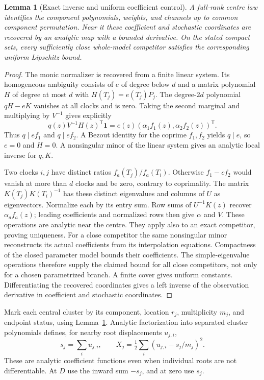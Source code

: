 \documentclass[11pt,reqno]{amsart}
\numberwithin{equation}{section}
\newtheorem{lemma}[theorem]{Lemma}
\theoremstyle{definition}
\theoremstyle{remark}
\newcommand{\one}{\mathbf 1}
\begin{document}
\begin{lemma}[Exact inverse and uniform coefficient control]\label{lem:inverse}
A full-rank centre law identifies the component polynomials, weights, and channels up to common component permutation. Near it these coefficient and stochastic coordinates are recovered by an analytic map with a bounded derivative. On the stated compact sets, every sufficiently close whole-model competitor satisfies the corresponding uniform Lipschitz bound.
\end{lemma}
\begin{proof}
The monic normalizer is recovered from a finite linear system. Its homogeneous ambiguity consists of $e$ of degree below $d$ and a matrix polynomial $H$ of degree at most $d$ with $H(T_j)=e(T_j)P_j$. The degree-$2d$ polynomial $qH-eK$ vanishes at all clocks and is zero. Taking the second marginal and multiplying by $V^{-1}$ gives explicitly
\[
 q(z)V^{-1}H(z)^{\mathsf T}\one
       =e(z)(\alpha_1 f_1(z),\alpha_2 f_2(z))^{\mathsf T}.
\]
Thus $q\mid ef_1$ and $q\mid ef_2$. A Bezout identity for the coprime $f_1,f_2$ yields $q\mid e$, so $e=0$ and $H=0$. A nonsingular minor of the linear system gives an analytic local inverse for $q,K$.

Two clocks $i,j$ have distinct ratios $f_a(T_j)/f_a(T_i)$. Otherwise $f_1-cf_2$ would vanish at more than $d$ clocks and be zero, contrary to coprimality. The matrix $K(T_j)K(T_i)^{-1}$ has these distinct eigenvalues and columns of $U$ as eigenvectors. Normalize each by its entry sum. Row sums of $U^{-1}K(z)$ recover $\alpha_a f_a(z)$; leading coefficients and normalized rows then give $\alpha$ and $V$. These operations are analytic near the centre. They apply also to an exact competitor, proving uniqueness. For a close competitor the same nonsingular minor reconstructs its actual coefficients from its interpolation equations. Compactness of the closed parameter model bounds their coefficients. The simple-eigenvalue operations therefore supply the claimed bound for all close competitors, not only for a chosen parametrized branch. A finite cover gives uniform constants. Differentiating the recovered coordinates gives a left inverse of the observation derivative in coefficient and stochastic coordinates.
\end{proof}

Mark each central cluster by its component, location $r_j$, multiplicity $m_j$, and endpoint status, using Lemma~\ref{lem:inverse}. Analytic factorization into separated cluster polynomials defines, for nearby root displacements $u_{j,i}$,
\[
 s_j=\sum_i u_{j,i},\qquad X_j=\tfrac12\sum_i(u_{j,i}-s_j/m_j)^2.
\]
These are analytic coefficient functions even when individual roots are not differentiable. At $D$ use the inward sum $-s_j$, and at zero use $s_j$.
\end{document}
